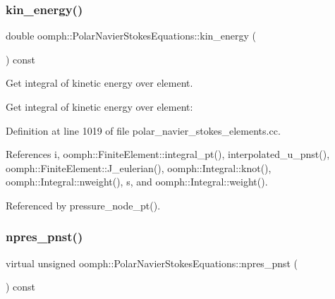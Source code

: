 \mbox{\label{classoomph_1_1PolarNavierStokesEquations_a1e9cfddfe57aa786569129ea22c637b0}} 
\subsubsection{\texorpdfstring{kin\+\_\+energy()}{kin\_energy()}}
{\footnotesize\ttfamily double oomph\+::\+Polar\+Navier\+Stokes\+Equations\+::kin\+\_\+energy (\begin{DoxyParamCaption}{ }\end{DoxyParamCaption}) const}



Get integral of kinetic energy over element. 

Get integral of kinetic energy over element\+: 

Definition at line 1019 of file polar\+\_\+navier\+\_\+stokes\+\_\+elements.\+cc.



References i, oomph\+::\+Finite\+Element\+::integral\+\_\+pt(), interpolated\+\_\+u\+\_\+pnst(), oomph\+::\+Finite\+Element\+::\+J\+\_\+eulerian(), oomph\+::\+Integral\+::knot(), oomph\+::\+Integral\+::nweight(), s, and oomph\+::\+Integral\+::weight().



Referenced by pressure\+\_\+node\+\_\+pt().

\mbox{\label{classoomph_1_1PolarNavierStokesEquations_af66cafead00372b56b677ab40a184d1f}} 
\subsubsection{\texorpdfstring{npres\+\_\+pnst()}{npres\_pnst()}}
{\footnotesize\ttfamily virtual unsigned oomph\+::\+Polar\+Navier\+Stokes\+Equations\+::npres\+\_\+pnst (\begin{DoxyParamCaption}{ }\end{DoxyParamCaption}) const\hspace{0.3cm}{\ttfamily [pure virtual]}}



